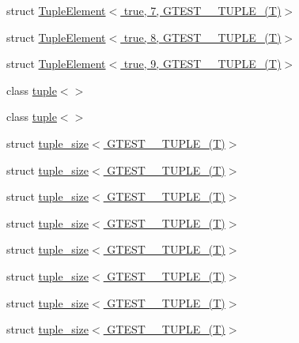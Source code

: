 \begin{DoxyCompactItemize}
struct \hyperlink{structstd_1_1tr1_1_1gtest__internal_1_1TupleElement_3_01true_00_017_00_01GTEST__10__TUPLE___07T_08_4}{\-Tuple\-Element$<$ true, 7, G\-T\-E\-S\-T\-\_\-\_\-\-T\-U\-P\-L\-E\-\_\-(\-T)$>$}
\item 
struct \hyperlink{structstd_1_1tr1_1_1gtest__internal_1_1TupleElement_3_01true_00_018_00_01GTEST__10__TUPLE___07T_08_4}{\-Tuple\-Element$<$ true, 8, G\-T\-E\-S\-T\-\_\-\_\-\-T\-U\-P\-L\-E\-\_\-(\-T)$>$}
\item 
struct \hyperlink{structstd_1_1tr1_1_1gtest__internal_1_1TupleElement_3_01true_00_019_00_01GTEST__10__TUPLE___07T_08_4}{\-Tuple\-Element$<$ true, 9, G\-T\-E\-S\-T\-\_\-\_\-\-T\-U\-P\-L\-E\-\_\-(\-T)$>$}
\item 
class \hyperlink{classstd_1_1tr1_1_1tuple_3_4}{tuple$<$$>$}
\item 
class \hyperlink{classstd_1_1tr1_1_1tuple}{tuple$<$$>$}
\item 
struct \hyperlink{structstd_1_1tr1_1_1tuple__size_3_01GTEST__0__TUPLE___07T_08_4}{tuple\-\_\-size$<$ G\-T\-E\-S\-T\-\_\-\_\-\-T\-U\-P\-L\-E\-\_\-(\-T)$>$}
\item 
struct \hyperlink{structstd_1_1tr1_1_1tuple__size_3_01GTEST__1__TUPLE___07T_08_4}{tuple\-\_\-size$<$ G\-T\-E\-S\-T\-\_\-\_\-\-T\-U\-P\-L\-E\-\_\-(\-T)$>$}
\item 
struct \hyperlink{structstd_1_1tr1_1_1tuple__size_3_01GTEST__2__TUPLE___07T_08_4}{tuple\-\_\-size$<$ G\-T\-E\-S\-T\-\_\-\_\-\-T\-U\-P\-L\-E\-\_\-(\-T)$>$}
\item 
struct \hyperlink{structstd_1_1tr1_1_1tuple__size_3_01GTEST__3__TUPLE___07T_08_4}{tuple\-\_\-size$<$ G\-T\-E\-S\-T\-\_\-\_\-\-T\-U\-P\-L\-E\-\_\-(\-T)$>$}
\item 
struct \hyperlink{structstd_1_1tr1_1_1tuple__size_3_01GTEST__4__TUPLE___07T_08_4}{tuple\-\_\-size$<$ G\-T\-E\-S\-T\-\_\-\_\-\-T\-U\-P\-L\-E\-\_\-(\-T)$>$}
\item 
struct \hyperlink{structstd_1_1tr1_1_1tuple__size_3_01GTEST__5__TUPLE___07T_08_4}{tuple\-\_\-size$<$ G\-T\-E\-S\-T\-\_\-\_\-\-T\-U\-P\-L\-E\-\_\-(\-T)$>$}
\item 
struct \hyperlink{structstd_1_1tr1_1_1tuple__size_3_01GTEST__6__TUPLE___07T_08_4}{tuple\-\_\-size$<$ G\-T\-E\-S\-T\-\_\-\_\-\-T\-U\-P\-L\-E\-\_\-(\-T)$>$}
\item 
struct \hyperlink{structstd_1_1tr1_1_1tuple__size_3_01GTEST__7__TUPLE___07T_08_4}{tuple\-\_\-size$<$ G\-T\-E\-S\-T\-\_\-\_\-\-T\-U\-P\-L\-E\-\_\-(\-T)$>$}
\item 

\end{DoxyCompactItemize}
